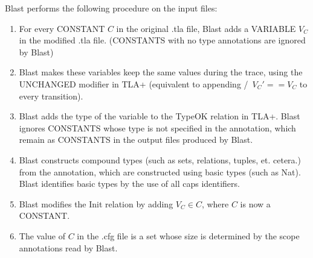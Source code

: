Blast performs the following procedure on the input files:

\begin{enumerate}
	\item For every CONSTANT $C$ in the original .tla file, Blast adds a VARIABLE $V_{C}$ in the modified .tla file. (CONSTANTS with no type annotations are ignored by Blast)
	\item Blast makes these variables keep the same values during the trace, using the UNCHANGED modifier in TLA+ (equivalent to appending /\ $V_{C}' == V_{C}$ to every transition).
	\item Blast adds the type of the variable to the TypeOK relation in TLA+. Blast ignores CONSTANTS whose type is not specified in the annotation, which remain as CONSTANTS in the output files produced by Blast. 
	\item Blast constructs compound types (such as sets, relations, tuples, et. cetera.) from the annotation, which are constructed using basic types (such as Nat). Blast identifies basic types by the use of all caps identifiers.
	\item Blast modifies the Init relation by adding $V_{C} \in C$, where $C$ is now a CONSTANT.
	\item The value of $C$ in the .cfg file is a set whose size is determined by the scope annotations read by Blast.
\end{enumerate}



